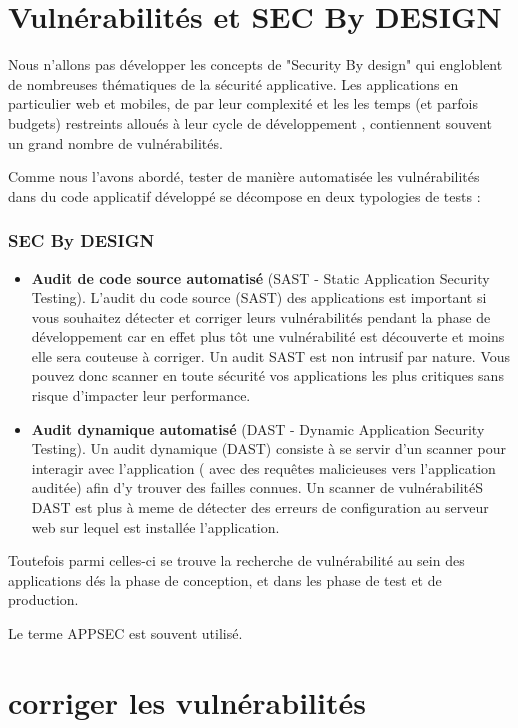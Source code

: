 
\section{Vulnérabilités et SEC By DESIGN}

Nous n'allons pas développer les concepts de "Security By design" qui  engloblent de nombreuses thématiques de la sécurité applicative.
Les applications en particulier web et mobiles, de par leur complexité et les les temps (et parfois budgets) restreints alloués à leur cycle de développement , contiennent souvent un grand nombre de vulnérabilités.

Comme nous l'avons abordé, tester de manière automatisée les vulnérabilités dans du code applicatif développé se décompose en deux typologies de tests :

\begin{frame}
\frametitle<presentation>{SEC By DESIGN}
\begin{itemize}
  \item  \textbf{Audit de code source automatisé} (SAST - Static Application Security Testing). L’audit du code source (SAST) des applications est important si vous souhaitez détecter et corriger leurs vulnérabilités pendant la phase de développement car en effet plus tôt une vulnérabilité est découverte et moins elle sera couteuse à corriger.
Un audit SAST est non intrusif par nature. Vous pouvez donc scanner en toute sécurité vos applications les plus critiques sans risque d’impacter leur performance.
  \item   \textbf{Audit dynamique automatisé }(DAST - Dynamic Application Security Testing). Un audit dynamique (DAST) consiste à se servir d’un scanner pour interagir avec l’application ( avec des requêtes malicieuses vers l’application auditée)  afin d’y trouver des failles connues.
Un scanner de vulnérabilitéS DAST est plus à meme de détecter des erreurs de configuration au serveur web sur lequel est installée l’application.

\end{itemize}
\end{frame}

Toutefois parmi celles-ci se trouve la recherche de vulnérabilité au sein des applications dés la phase de conception, et dans les phase de test et de production.

Le terme APPSEC est souvent utilisé.  

\section{corriger les vulnérabilités}

